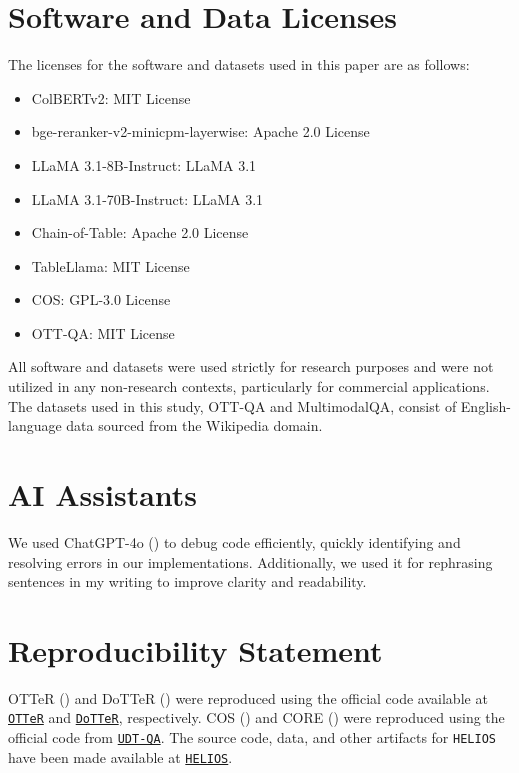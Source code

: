 \section{Software and Data Licenses}
The licenses for the software and datasets used in this paper are as follows:
\begin{itemize}
    \item ColBERTv2: MIT License
    \item bge-reranker-v2-minicpm-layerwise: Apache 2.0 License
    \item LLaMA 3.1-8B-Instruct: LLaMA 3.1
    \item LLaMA 3.1-70B-Instruct: LLaMA 3.1
    \item Chain-of-Table: Apache 2.0 License
    \item TableLlama: MIT License
    \item COS: GPL-3.0 License
    \item OTT-QA: MIT License
\end{itemize}
All software and datasets were used strictly for research purposes and were not utilized in any non-research contexts, particularly for commercial applications.
The datasets used in this study, OTT-QA and MultimodalQA, consist of English-language data sourced from the Wikipedia domain.

\section{AI Assistants}
We used ChatGPT-4o (\citealp{hurst2024gpt}) to debug code efficiently, quickly identifying and resolving errors in our implementations. 
Additionally, we used it for rephrasing sentences in my writing to improve clarity and readability.




\section{Reproducibility Statement} 
OTTeR (\citealp{OTTeR}) and DoTTeR (\citealp{DoTTeR}) were reproduced using the official code available at \href{https://github.com/Jun-jie-Huang/OTTeR}{\texttt{OTTeR}} and \href{https://github.com/deokhk/DoTTeR}{\texttt{DoTTeR}}, respectively. COS (\citealp{COS}) and CORE (\citealp{CORE}) were reproduced using the official code from \href{https://github.com/Mayer123/UDT-QA}{\texttt{UDT-QA}}. 
The source code, data, and other artifacts for \texttt{HELIOS} have been made available at \href{https://github.com/pshlego/HELIOS}{\texttt{HELIOS}}.

